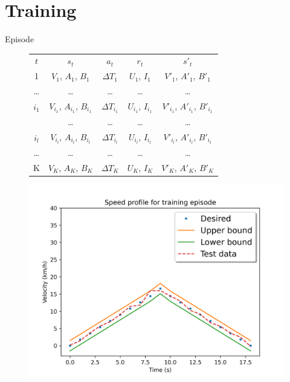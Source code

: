 \documentclass{article}
\begin{document}
\section{Training}\label{sec:training}

Episode

\begin{figure}
	\begin{minipage}[b]{0.45\linewidth}
		\centering
		\begin{tabular}{c c c c c}
			\toprule
			$t$     & $s_{t}$                               & $a_t$              & $r_t$                    & $s'_t$                                   \\
			\cmidrule(r){1-1} \cmidrule(r){2-4} \cmidrule{5-5}
			1       & $V_1$, $A_1$, $B_1$                   & $\Delta T_{1}$     & $U_{1}$, $I_{1}$         & $V'_1$, $A'_1$, $B'_1$                   \\
			\ldots  & \ldots                                & \ldots             & \ldots                   & \ldots                                   \\
			$i_{1}$ & $V_{i_{1}}$, $A_{i_{1}}$, $B_{i_{1}}$ & $\Delta T_{i_{1}}$ & $U_{i_{1}}$, $I_{i_{1}}$ & $V'_{i_{1}}$, $A'_{i_{1}}$, $B'_{i_{1}}$ \\
			        & \ldots                                & \ldots             & \ldots                   & \ldots                                   \\
			$i_{l}$ & $V_{i_{l}}$, $A_{i_l}$, $B_{i_l}$     & $\Delta T_{i_{l}}$ & $U_{i_{l}}$, $I_{i_{l}}$ & $V'_{i_{l}}$, $A'_{i_{l}}$, $B'_{i_{l}}$ \\
			\ldots  & \ldots                                & \ldots             & \ldots                   & \ldots                                   \\
			K       & $V_K$, $A_K$, $B_K$                   & $\Delta T_{K}$     & $U_K$, $I_K$             & $V'_K$, $A'_K$, $B'_K$                   \\
			\bottomrule
		\end{tabular}
	\end{minipage}\hfill
	\begin{minipage}[b]{0.45\linewidth}
		\centering
		\includegraphics[scale=0.5]{images/speed_profile.png}

\end{minipage}
\end{figure}
\end{document}
